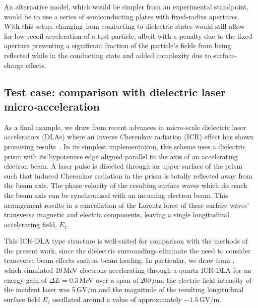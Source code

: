 \documentclass[reprint,
               amsmath,amssymb,nofootinbib, aps%
              ]{revtex4-2}
\begin{document}
An alternative model, which would be simpler from an experimental standpoint, would be to use a series of semiconducting plates with fixed-radius apertures. With this setup, changing from conducting to dielectric states would still allow for low-recoil acceleration of a test particle, albeit with a penalty due to the fixed aperture preventing a significant fraction of the particle's fields from being reflected while in the conducting state and added complexity due to surface-charge effects. %


\subsection{Test case: comparison with dielectric laser micro-acceleration}
As a final example, we draw from recent advances in micro-scale dielectric laser accelerators (DLAs) where an inverse Cherenkov radiation (ICR) effect has shown promising results~\cite{liu_2020,sun_bin_2023,sun_li_2023,volkov_2022,Sun_li_2021,Kozak_17}. In its simplest implementation, this scheme uses a dielectric prism with its hypotenuse edge aligned parallel to the axis of an accelerating electron beam. A laser pulse is directed through an upper surface of the prism such that induced Cherenkov radiation in the prism is totally reflected away from the beam axis. The phase velocity of the resulting surface waves which do reach the beam axis can be synchronized with an incoming electron beam. This arrangement results in a cancellation of the Lorentz force of these surface waves' transverse magnetic and electric components, leaving a single longitudinal accelerating field, $E_z$.

This ICR-DLA type structure is well-suited for comparison with the methods of the present work, since the dielectric surroundings eliminate the need to consider transverse beam effects such as beam loading. In particular, we draw from \cite{liu_2020}, which simulated 10\,MeV electrons accelerating through a quartz ICR-DLA for an energy gain of $\Delta E = 0.3$\,MeV over a span of 200\,{${\mu}$}m; the electric field intensity of the incident laser was 5\,GV/m and the magnitude of the resulting longitudinal surface field $E_z$ oscillated around a value of approximately $-1.5$\,GV/m.
\end{document}
